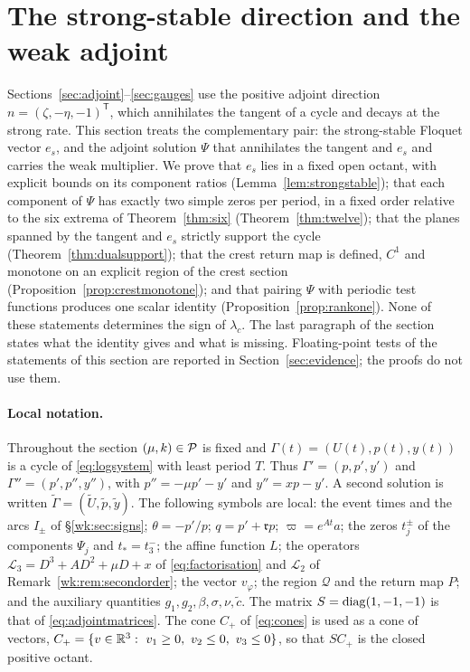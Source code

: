 \section{The strong-stable direction and the weak adjoint}\label{sec:weakadjoint}

Sections~\ref{sec:adjoint}--\ref{sec:gauges} use the positive adjoint direction $n=(\zeta,-\eta,-1)^{\mathsf T}$, which annihilates the tangent of a cycle and decays at the strong rate. This section treats the complementary pair: the strong-stable Floquet vector $e_s$, and the adjoint solution $\Psi$ that annihilates the tangent and $e_s$ and carries the weak multiplier. We prove that $e_s$ lies in a fixed open octant, with explicit bounds on its component ratios (Lemma~\ref{lem:strongstable}); that each component of $\Psi$ has exactly two simple zeros per period, in a fixed order relative to the six extrema of Theorem~\ref{thm:six} (Theorem~\ref{thm:twelve}); that the planes spanned by the tangent and $e_s$ strictly support the cycle (Theorem~\ref{thm:dualsupport}); that the crest return map is defined, $C^1$ and monotone on an explicit region of the crest section (Proposition~\ref{prop:crestmonotone}); and that pairing $\Psi$ with periodic test functions produces one scalar identity (Proposition~\ref{prop:rankone}). None of these statements determines the sign of $\lambda_c$. The last paragraph of the section states what the identity gives and what is missing. Floating-point tests of the statements of this section are reported in Section~\ref{sec:evidence}; the proofs do not use them.

\paragraph{Local notation.}
Throughout the section $(\mu,k)\in\mathcal P$ is fixed and $\Gamma(t)=(U(t),p(t),y(t))$ is a cycle of \eqref{eq:logsystem} with least period $T$. Thus $\Gamma'=(p,p',y')$ and $\Gamma''=(p',p'',y'')$, with $p''=-\mu p'-y'$ and $y''=xp-y'$. A second solution is written $\tilde\Gamma=(\tilde U,\tilde p,\tilde y)$. The following symbols are local: the event times and the arcs $I_\pm$ of \S\ref{wk:sec:signs}; $\theta=-p'/p$; $q=p'+\mathfrak r p$; $\varpi=e^{At}a$; the zeros $t_j^\pm$ of the components $\Psi_j$ and $t_\ast=t_3^-$; the affine function $L$; the operators $\mathcal L_3=D^3+AD^2+\mu D+x$ of \eqref{eq:factorisation} and $\mathcal L_2$ of Remark~\ref{wk:rem:secondorder}; the vector $v_\varphi$; the region $\mathcal Q$ and the return map $P$; and the auxiliary quantities $g_1,g_2,\beta,\sigma,\nu,\tilde c$. The matrix $S=\operatorname{diag}(1,-1,-1)$ is that of \eqref{eq:adjointmatrices}. The cone $C_+$ of \eqref{eq:cones} is used as a cone of vectors, $C_+=\{v\in\R^3:\ v_1\ge0,\ v_2\le0,\ v_3\le0\}$, so that $SC_+$ is the closed positive octant.

